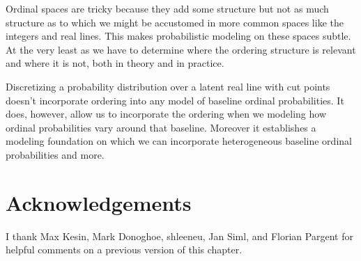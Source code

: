 \documentclass[
  letterpaper,
  DIV=11,
  numbers=noendperiod]{scrartcl}
\begin{document}
Ordinal spaces are tricky because they add some structure but not as
much structure as to which we might be accustomed in more common spaces
like the integers and real lines. This makes probabilistic modeling on
these spaces subtle. At the very least as we have to determine where the
ordering structure is relevant and where it is not, both in theory and
in practice.

Discretizing a probability distribution over a latent real line with cut
points doesn't incorporate ordering into any model of baseline ordinal
probabilities. It does, however, allow us to incorporate the ordering
when we modeling how ordinal probabilities vary around that baseline.
Moreover it establishes a modeling foundation on which we can
incorporate heterogeneous baseline ordinal probabilities and more.

\section*{Acknowledgements}\label{acknowledgements}

I thank Max Kesin, Mark Donoghoe, shleeneu, Jan Siml, and Florian
Pargent for helpful comments on a previous version of this chapter.
\end{document}
